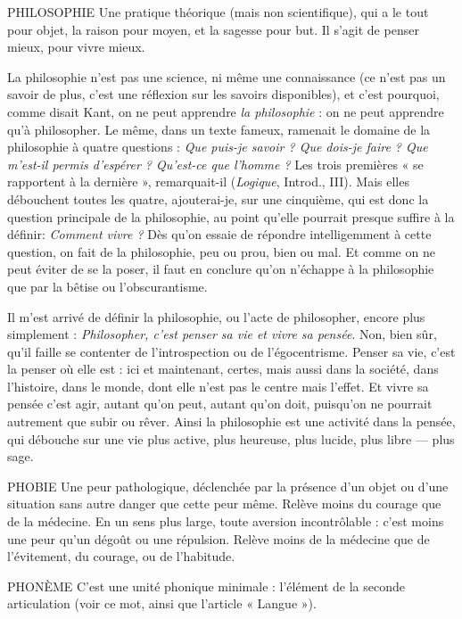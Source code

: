 PHILOSOPHIE Une pratique théorique (mais non scientifique), qui a le
tout pour objet, la raison pour moyen, et la sagesse pour
but. Il s’agit de penser mieux, pour vivre mieux.

La philosophie n’est pas une science, ni même une connaissance (ce n’est
pas un savoir de plus, c’est une réflexion sur les savoirs disponibles), et c’est
pourquoi, comme disait Kant, on ne peut apprendre {\it la philosophie} : on ne
peut apprendre qu’à philosopher. Le même, dans un texte fameux, ramenait
le domaine de la philosophie à quatre questions : {\it Que puis-je savoir ? Que
dois-je faire ? Que m'est-il permis d'espérer ? Qu'est-ce que l'homme ?} Les trois
premières « se rapportent à la dernière », remarquait-il ({\it Logique}, Introd.,
III). Mais elles débouchent toutes les quatre, ajouterai-je, sur une cinquième,
qui est donc la question principale de la philosophie, au point
qu’elle pourrait presque suffire à la définir: {\it Comment vivre ?} Dès qu'on
essaie de répondre intelligemment à cette question, on fait de la philosophie,
peu ou prou, bien ou mal. Et comme on ne peut éviter de se la poser, il faut
en conclure qu’on n'échappe à la philosophie que par la bêtise ou l’obscurantisme.

Il m'est arrivé de définir la philosophie, ou l’acte de philosopher, encore
plus simplement : {\it Philosopher, c'est penser sa vie et vivre sa pensée}. Non, bien sûr,
qu’il faille se contenter de l’introspection ou de l’égocentrisme. Penser sa vie,
c’est la penser où elle est : ici et maintenant, certes, mais aussi dans la société,
dans l’histoire, dans le monde, dont elle n’est pas le centre mais l'effet. Et vivre
sa pensée c’est agir, autant qu’on peut, autant qu’on doit, puisqu'on ne pourrait
autrement que subir ou rêver. Ainsi la philosophie est une activité dans la
pensée, qui débouche sur une vie plus active, plus heureuse, plus lucide, plus
libre — plus sage.

PHOBIE Une peur pathologique, déclenchée par la présence d’un objet ou
d’une situation sans autre danger que cette peur même. Relève
moins du courage que de la médecine.
En un sens plus large, toute aversion incontrôlable : c’est moins une peur
qu’un dégoût ou une répulsion. Relève moins de la médecine que de l’évitement,
du courage, ou de l’habitude.

PHONÈME C’est une unité phonique minimale : l'élément de la seconde
articulation (voir ce mot, ainsi que l’article « Langue »).


